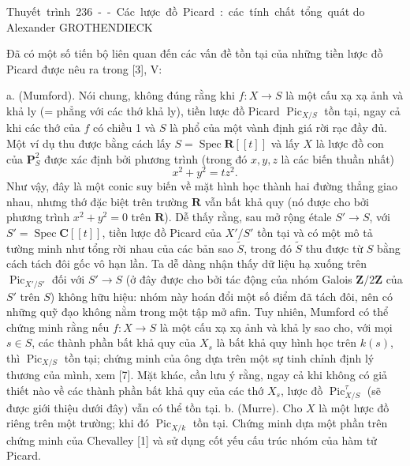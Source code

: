 \unit{Thuyết trình 236 -- Các lược đồ Picard: các tính chất tổng quát}
%
  {do Alexander GROTHENDIECK}


Đã có một số tiến bộ liên quan đến các vấn đề tồn tại của những tiền lược đồ
Picard được nêu ra trong [3], V:

\medskip
\noindent a. (Mumford). Nói chung, không đúng rằng khi
$f:X\longrightarrow S$ là một cấu xạ xạ ảnh và khả ly (= phẳng với các thớ
khả ly), tiền lược đồ Picard $\operatorname{Pic}_{X/S}$ tồn tại, ngay cả khi
các thớ của $f$ có chiều 1 và $S$ là phổ của một vành định giá rời rạc đầy đủ.
Một ví dụ thu được bằng cách lấy $S=\operatorname{Spec}\mathbf R[[t]]$ và lấy
$X$ là lược đồ con của $\mathbf P^2_S$ được xác định bởi phương trình (trong đó
$x,y,z$ là các biến thuần nhất)
\[
x^2+y^2=tz^2.
\]
Như vậy, đây là một conic suy biến về mặt hình học thành hai đường thẳng giao
nhau, nhưng thớ đặc biệt trên trường $\mathbf R$ vẫn bất khả quy (nó được cho
bởi phương trình $x^2+y^2=0$ trên $\mathbf R$). Dễ thấy rằng, sau mở rộng étale
$S'\longrightarrow S$, với $S'=\operatorname{Spec}\mathbf C[[t]]$, tiền lược
đồ Picard của $X'/S'$ tồn tại và có một mô tả tường minh như tổng rời nhau của
các bản sao $\widetilde S$, trong đó $\widetilde S$ thu được từ $S$ bằng
cách tách đôi gốc vô hạn lần. Ta dễ dàng nhận thấy dữ liệu hạ xuống trên
$\operatorname{Pic}_{X'/S'}$ đối với $S'\longrightarrow S$ (ở đây được cho
bởi tác động của nhóm Galois $\mathbf Z/2\mathbf Z$ của $S'$ trên $S$) không
hữu hiệu: nhóm này hoán đổi một số điểm đã tách đôi, nên có những quỹ đạo không
nằm trong một tập mở afin. Tuy nhiên, Mumford có thể chứng minh rằng nếu
$f:X\longrightarrow S$ là một cấu xạ xạ ảnh và khả ly sao cho, với mọi
$s\in S$, các thành phần bất khả quy của $X_s$ là bất khả quy hình học trên
$k(s)$, thì $\operatorname{Pic}_{X/S}$ tồn tại; chứng minh của ông dựa trên
một sự tinh chỉnh định lý thương của mình, xem [7]. Mặt khác, cần lưu ý rằng,
ngay cả khi không có giả thiết nào về các thành phần bất khả quy của các thớ
$X_s$, lược đồ $\operatorname{Pic}^{\tau}_{X/S}$ (sẽ được giới thiệu dưới
đây) vẫn có thể tồn tại.
\noindent b. (Murre). Cho $X$ là một lược đồ riêng trên một trường; khi đó
$\operatorname{Pic}_{X/k}$ tồn tại. Chứng minh dựa một phần trên chứng minh
của Chevalley [1] và sử dụng cốt yếu cấu trúc nhóm của hàm tử Picard.

